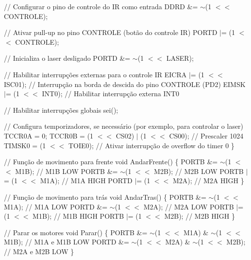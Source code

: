 // Configurar o pino de controle do IR como entrada DDRD \&= \texorpdfstring{$\sim$}{\string~}(1 \texorpdfstring{$<$}{<}\texorpdfstring{$<$}{<} CONTROLE);

// Ativar pull-\/up no pino CONTROLE (botão do controle IR) PORTD \texorpdfstring{$\vert$}{|}= (1 \texorpdfstring{$<$}{<}\texorpdfstring{$<$}{<} CONTROLE);

// Inicializa o laser desligado PORTD \&= \texorpdfstring{$\sim$}{\string~}(1 \texorpdfstring{$<$}{<}\texorpdfstring{$<$}{<} LASER);

// Habilitar interrupções externas para o controle IR EICRA \texorpdfstring{$\vert$}{|}= (1 \texorpdfstring{$<$}{<}\texorpdfstring{$<$}{<} ISC01); // Interrupção na borda de descida do pino CONTROLE (PD2) EIMSK \texorpdfstring{$\vert$}{|}= (1 \texorpdfstring{$<$}{<}\texorpdfstring{$<$}{<} INT0); // Habilitar interrupção externa INT0

// Habilitar interrupções globais sei();

// Configura temporizadores, se necessário (por exemplo, para controlar o laser) TCCR0A = 0; TCCR0B = (1 \texorpdfstring{$<$}{<}\texorpdfstring{$<$}{<} CS02) \texorpdfstring{$\vert$}{|} (1 \texorpdfstring{$<$}{<}\texorpdfstring{$<$}{<} CS00); // Prescaler 1024 TIMSK0 = (1 \texorpdfstring{$<$}{<}\texorpdfstring{$<$}{<} TOIE0); // Ativar interrupção de overflow do timer 0 \}

// Função de movimento para frente void Andar\+Frente() \{ PORTB \&= \texorpdfstring{$\sim$}{\string~}(1 \texorpdfstring{$<$}{<}\texorpdfstring{$<$}{<} M1B); // M1B LOW PORTB \&= \texorpdfstring{$\sim$}{\string~}(1 \texorpdfstring{$<$}{<}\texorpdfstring{$<$}{<} M2B); // M2B LOW PORTB \texorpdfstring{$\vert$}{|}= (1 \texorpdfstring{$<$}{<}\texorpdfstring{$<$}{<} M1A); // M1A HIGH PORTD \texorpdfstring{$\vert$}{|}= (1 \texorpdfstring{$<$}{<}\texorpdfstring{$<$}{<} M2A); // M2A HIGH \}

// Função de movimento para trás void Andar\+Tras() \{ PORTB \&= \texorpdfstring{$\sim$}{\string~}(1 \texorpdfstring{$<$}{<}\texorpdfstring{$<$}{<} M1A); // M1A LOW PORTD \&= \texorpdfstring{$\sim$}{\string~}(1 \texorpdfstring{$<$}{<}\texorpdfstring{$<$}{<} M2A); // M2A LOW PORTB \texorpdfstring{$\vert$}{|}= (1 \texorpdfstring{$<$}{<}\texorpdfstring{$<$}{<} M1B); // M1B HIGH PORTB \texorpdfstring{$\vert$}{|}= (1 \texorpdfstring{$<$}{<}\texorpdfstring{$<$}{<} M2B); // M2B HIGH \}

// Parar os motores void Parar() \{ PORTB \&= \texorpdfstring{$\sim$}{\string~}(1 \texorpdfstring{$<$}{<}\texorpdfstring{$<$}{<} M1A) \& \texorpdfstring{$\sim$}{\string~}(1 \texorpdfstring{$<$}{<}\texorpdfstring{$<$}{<} M1B); // M1A e M1B LOW PORTD \&= \texorpdfstring{$\sim$}{\string~}(1 \texorpdfstring{$<$}{<}\texorpdfstring{$<$}{<} M2A) \& \texorpdfstring{$\sim$}{\string~}(1 \texorpdfstring{$<$}{<}\texorpdfstring{$<$}{<} M2B); // M2A e M2B LOW \}

